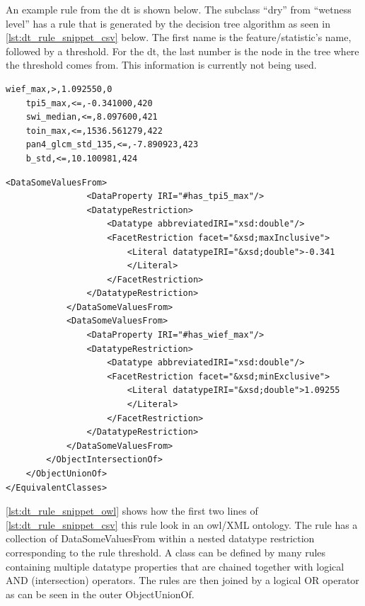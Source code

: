 \documentclass[authoryear,review,12pt,number]{elsarticle}
\begin{document}
An example rule from the \gls{dt} is shown below. The subclass ``dry'' from
``wetness level'' has a rule that is generated by the decision tree algorithm as
seen in \ref{lst:dt_rule_snippet_csv} below. The first name is the
feature/statistic's name, followed by a threshold. For the \gls{dt}, the last
number is the node in the tree where the threshold comes from. This information
is currently not being used.
\lstset{language=XML,tabsize=2, label=lst:dt_rule_snippet_csv, caption=\lstname}
\begin{lstlisting}[frame=single]
    wief_max,>,1.092550,0
    tpi5_max,<=,-0.341000,420
    swi_median,<=,8.097600,421
    toin_max,<=,1536.561279,422
    pan4_glcm_std_135,<=,-7.890923,423
    b_std,<=,10.100981,424
\end{lstlisting}

\lstset{basicstyle=\footnotesize,language=XML,tabsize=2,
label=lst:dt_rule_snippet_owl , caption=\lstname, breaklines=true}
\begin{lstlisting}[frame=single,fontadjust]
            <DataSomeValuesFrom>
                <DataProperty IRI="#has_tpi5_max"/>
                <DatatypeRestriction>
                    <Datatype abbreviatedIRI="xsd:double"/>
                    <FacetRestriction facet="&xsd;maxInclusive">
                        <Literal datatypeIRI="&xsd;double">-0.341
                        </Literal>
                    </FacetRestriction>
                </DatatypeRestriction>
            </DataSomeValuesFrom>
            <DataSomeValuesFrom>
                <DataProperty IRI="#has_wief_max"/>
                <DatatypeRestriction>
                    <Datatype abbreviatedIRI="xsd:double"/>
                    <FacetRestriction facet="&xsd;minExclusive">
                        <Literal datatypeIRI="&xsd;double">1.09255
                        </Literal>
                    </FacetRestriction>
                </DatatypeRestriction>
            </DataSomeValuesFrom>
        </ObjectIntersectionOf>
    </ObjectUnionOf>
</EquivalentClasses>
\end{lstlisting}

\ref{lst:dt_rule_snippet_owl} shows how the first two lines of 
\ref{lst:dt_rule_snippet_csv} this rule look in an \gls{owl}/XML ontology. The 
rule has a collection of DataSomeValuesFrom within a nested datatype 
restriction 
corresponding to the rule threshold. A class can be defined by many rules 
containing multiple datatype properties that are chained together with logical 
AND (intersection) operators. The rules are then joined by a logical OR 
operator 
as can be seen in the outer ObjectUnionOf.
\end{document}
